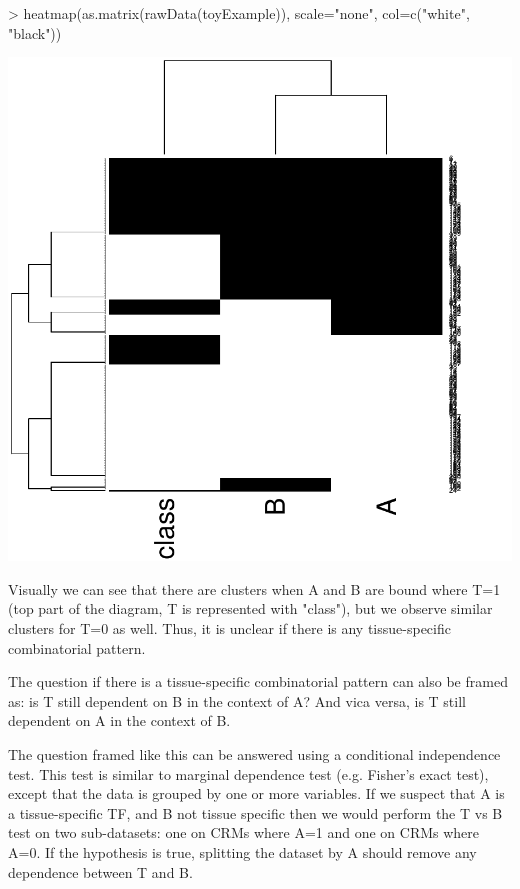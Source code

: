 \documentclass{article}
\begin{document}
\begin{Schunk}
\begin{Sinput}
> heatmap(as.matrix(rawData(toyExample)), scale="none", col=c("white", "black"))
\end{Sinput}
\end{Schunk}
\includegraphics{ddgraph-cluster}

Visually we can see that there are clusters when A and B are bound where T=1 (top part of the diagram, T is represented with "class"), but we observe similar clusters for T=0 as well. Thus, it is unclear if there is any tissue-specific combinatorial pattern. 

The question if there is a tissue-specific combinatorial pattern can also be framed as: is T still dependent on B in the context of A? And vica versa, is T still dependent on A in the context of B. 

The question framed like this can be answered using a conditional independence test. This test is similar to marginal dependence test (e.g. Fisher's exact test), except that the data is grouped by one or more variables. If we suspect that A is a tissue-specific TF, and B not tissue specific then we would perform the T vs B test on two sub-datasets: one on CRMs where A=1 and one on CRMs where A=0. If the hypothesis is true, splitting the dataset by A should remove any dependence between T and B. 
\end{document}
